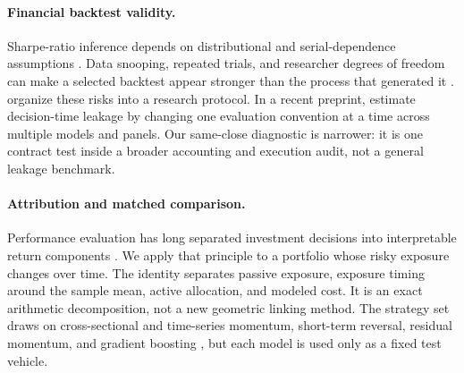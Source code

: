 \documentclass{article}
\begin{document}
\paragraph{Financial backtest validity.}
Sharpe-ratio inference depends on distributional and serial-dependence
assumptions \citep{lo2002statistics}. Data snooping, repeated trials, and
researcher degrees of freedom can make a selected backtest appear stronger than
the process that generated it \citep{white2000reality,bailey2014deflated,
bailey2017pbo,harvey2016crosssection}. \citet{arnott2019protocol} organize these
risks into a research protocol. In a recent preprint, \citet{zhang2026alpha}
estimate decision-time leakage by changing one evaluation convention at a time
across multiple models and panels. Our same-close diagnostic is narrower: it is
one contract test inside a broader accounting and execution audit, not a
general leakage benchmark.

\paragraph{Attribution and matched comparison.}
Performance evaluation has long separated investment decisions into
interpretable return components \citep{fama1972components,
brinson1985measuring}. We apply that principle to a portfolio whose risky
exposure changes over time. The identity separates passive exposure, exposure
timing around the sample mean, active allocation, and modeled cost. It is an
exact arithmetic decomposition, not a new geometric linking method. The
strategy set draws on cross-sectional and time-series momentum, short-term
reversal, residual momentum, and gradient boosting
\citep{jegadeesh1993returns,moskowitz2012timeseries,lehmann1990fads,
blitz2011residual,friedman2001greedy}, but each model is used only as a fixed
test vehicle.
\end{document}
